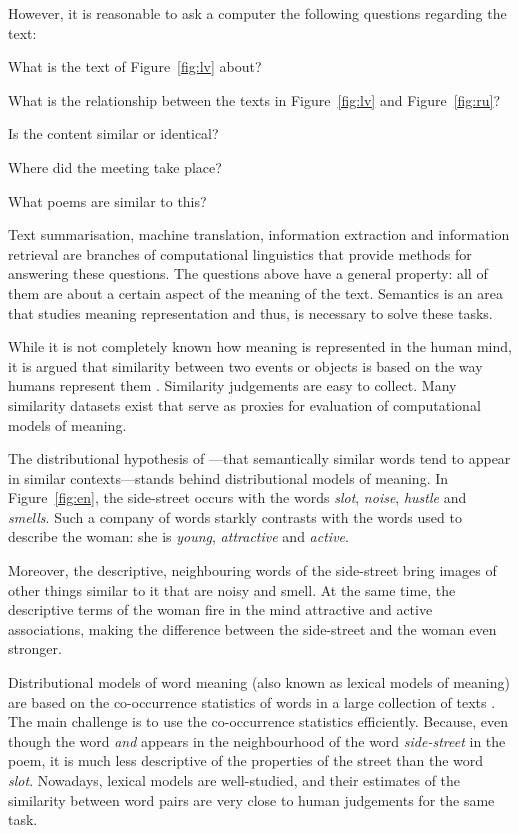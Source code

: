 However, it is reasonable to ask a computer the following questions regarding the text:
\begin{inparaenum}[a)]
\item What is the text of Figure~\ref{fig:lv} about?
\item What is the relationship between the texts in Figure~\ref{fig:lv} and
  Figure~\ref{fig:ru}?
\item Is the content similar or identical?
\item Where did the meeting take place?
\item What poems are similar to this?
\end{inparaenum}

Text summarisation, machine translation, information extraction and information retrieval are branches of computational linguistics that provide methods for answering these questions. The questions above have a general property: all of them are about a certain aspect of the meaning of the text. Semantics is an area that studies meaning representation and thus, is necessary to solve these tasks.

While it is not completely known how meaning is represented in the human mind, it is argued that similarity between two events or objects is based on the way humans represent them \cite{WCS:WCS1282}. Similarity judgements are easy to collect. Many similarity datasets exist that serve as proxies for evaluation of computational models of meaning.

The distributional hypothesis of \citet{harris1954distributional}---that semantically similar words tend to appear in similar contexts---stands behind distributional models of meaning. In Figure~\ref{fig:en}, the side-street occurs with the words \textit{slot}, \textit{noise}, \textit{hustle} and \textit{smells}. Such a company of words starkly contrasts with the words used to describe the woman: she is \textit{young}, \textit{attractive} and \textit{active}.

Moreover, the descriptive, neighbouring words of the side-street bring images of other things similar to it that are noisy and smell. At the same time, the descriptive terms of the woman fire in the mind attractive and active associations, making the difference between the side-street and the woman even stronger.

Distributional models of word meaning (also known as lexical models of meaning) are based on the co-occurrence statistics of words in a large collection of texts \cite{Turney:2010:FMV:1861751.1861756,mikolov2013linguistic,mikolov2013distributed,mikolov2013efficient}. The main challenge is to use the co-occurrence statistics efficiently. Because, even though the word \textit{and} appears in the neighbourhood of the word \textit{side-street} in the poem, it is much less descriptive of the properties of the street than the word \textit{slot}. Nowadays, lexical models are well-studied, and their estimates of the similarity between word pairs are very close to human judgements  for the same task\cite{TACL570,baroni-dinu-kruszewski:2014:P14-1,Halawi:2012:LLW:2339530.2339751}.

